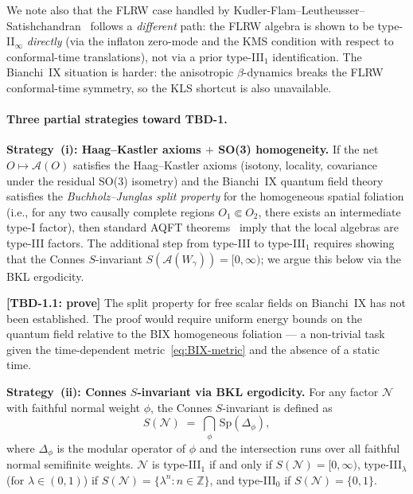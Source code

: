 We note also that the FLRW case handled by
Kudler-Flam--Leutheusser--Satishchandran~\cite{KLS2024}
follows a \emph{different} path: the FLRW algebra is shown to be
type-II$_\infty$ \emph{directly} (via the inflaton zero-mode and
the KMS condition with respect to conformal-time translations),
not via a prior type-III$_1$ identification.
The Bianchi~IX situation is harder: the anisotropic $\beta$-dynamics
breaks the FLRW conformal-time symmetry, so the KLS shortcut is also
unavailable.

\paragraph{Three partial strategies toward TBD-1.}

\vspace{4pt}
\noindent\textbf{Strategy~(i): Haag--Kastler axioms $+$ SO(3) homogeneity.}
If the net $O\mapsto\mathcal{A}(O)$ satisfies the Haag--Kastler
axioms (isotony, locality, covariance under the residual SO(3) isometry)
and the Bianchi~IX quantum field theory satisfies the
\emph{Buchholz--Junglas split property} for the homogeneous spatial foliation
(i.e., for any two causally complete regions $O_1\Subset O_2$,
there exists an intermediate type-I factor),
then standard AQFT theorems~\cite{Buchholz1986,BV1996} imply
that the local algebras are type-III factors.
The additional step from type-III to type-III$_1$ requires showing
that the Connes $S$-invariant $S(\mathcal{A}(W_\gamma))=[0,\infty)$;
we argue this below via the BKL ergodicity.

\noindent\textbf{[TBD-1.1: prove]} The split property for free
scalar fields on Bianchi~IX has not been established.
The proof would require uniform energy bounds on the quantum field
relative to the BIX homogeneous foliation ---
a non-trivial task given the time-dependent metric~\eqref{eq:BIX-metric}
and the absence of a static time.

\vspace{4pt}
\noindent\textbf{Strategy~(ii): Connes $S$-invariant via BKL ergodicity.}
For any factor $\mathcal{N}$ with faithful normal weight $\phi$,
the Connes $S$-invariant is defined as
\begin{equation}
  S(\mathcal{N}) \;=\; \bigcap_{\phi}\,
  \mathrm{Sp}(\Delta_\phi),
  \label{eq:S-invariant}
\end{equation}
where $\Delta_\phi$ is the modular operator of $\phi$ and
the intersection runs over all faithful normal semifinite weights.
$\mathcal{N}$ is type-III$_1$ if and only if $S(\mathcal{N})=[0,\infty)$,
type-III$_\lambda$ (for $\lambda\in(0,1)$) if $S(\mathcal{N})=
\{\lambda^n:n\in\mathbb{Z}\}$, and type-III$_0$ if $S(\mathcal{N})=\{0,1\}$.

